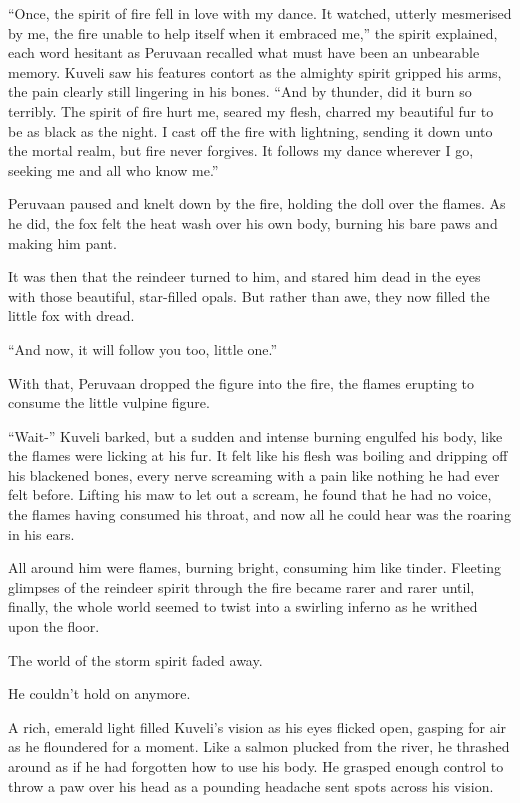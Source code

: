 ``Once, the spirit of fire fell in love with my dance. It watched, utterly mesmerised by me, the fire unable to help itself when it embraced me,'' the spirit explained, each word hesitant as Peruvaan recalled what must have been an unbearable memory. Kuveli saw his features contort as the almighty spirit gripped his arms, the pain clearly still lingering in his bones. ``And by thunder, did it burn so terribly. The spirit of fire hurt me, seared my flesh, charred my beautiful fur to be as black as the night. I cast off the fire with lightning, sending it down unto the mortal realm, but fire never forgives. It follows my dance wherever I go, seeking me and all who know me.''

Peruvaan paused and knelt down by the fire, holding the doll over the flames. As he did, the fox felt the heat wash over his own body, burning his bare paws and making him pant.

It was then that the reindeer turned to him, and stared him dead in the eyes with those beautiful, star-filled opals. But rather than awe, they now filled the little fox with dread.

``And now, it will follow you too, little one.''

With that, Peruvaan dropped the figure into the fire, the flames erupting to consume the little vulpine figure.

``Wait-'' Kuveli barked, but a sudden and intense burning engulfed his body, like the flames were licking at his fur. It felt like his flesh was boiling and dripping off his blackened bones, every nerve screaming with a pain like nothing he had ever felt before. Lifting his maw to let out a scream, he found that he had no voice, the flames having consumed his throat, and now all he could hear was the roaring in his ears.

All around him were flames, burning bright, consuming him like tinder. Fleeting glimpses of the reindeer spirit through the fire became rarer and rarer until, finally, the whole world seemed to twist into a swirling inferno as he writhed upon the floor.

The world of the storm spirit faded away.

He couldn't hold on anymore.

\secdiv

\noindent A rich, emerald light filled Kuveli's vision as his eyes flicked open, gasping for air as he floundered for a moment. Like a salmon plucked from the river, he thrashed around as if he had forgotten how to use his body. He grasped enough control to throw a paw over his head as a pounding headache sent spots across his vision.

